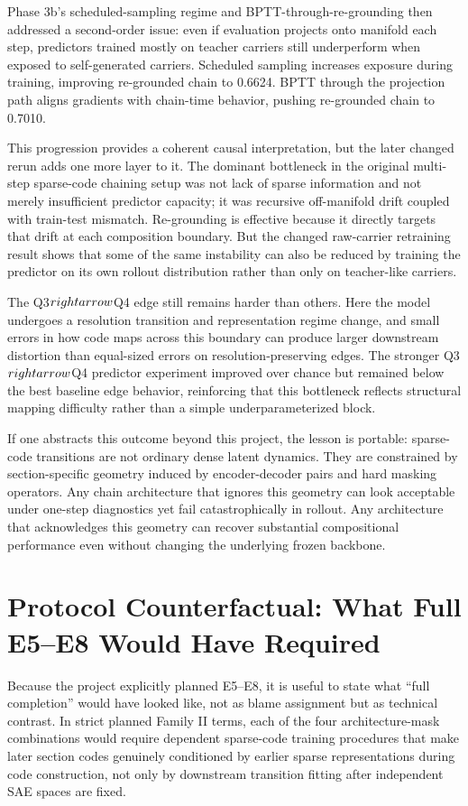 \documentclass[11pt]{article}
\begin{document}
Phase 3b's scheduled-sampling regime and BPTT-through-re-grounding then addressed a second-order issue: even if evaluation projects onto manifold each step, predictors trained mostly on teacher carriers still underperform when exposed to self-generated carriers. Scheduled sampling increases exposure during training, improving re-grounded chain to 0.6624. BPTT through the projection path aligns gradients with chain-time behavior, pushing re-grounded chain to 0.7010.

This progression provides a coherent causal interpretation, but the later changed rerun adds one more layer to it. The dominant bottleneck in the original multi-step sparse-code chaining setup was not lack of sparse information and not merely insufficient predictor capacity; it was recursive off-manifold drift coupled with train-test mismatch. Re-grounding is effective because it directly targets that drift at each composition boundary. But the changed raw-carrier retraining result shows that some of the same instability can also be reduced by training the predictor on its own rollout distribution rather than only on teacher-like carriers.

The Q3$\\rightarrow$Q4 edge still remains harder than others. Here the model undergoes a resolution transition and representation regime change, and small errors in how code maps across this boundary can produce larger downstream distortion than equal-sized errors on resolution-preserving edges. The stronger Q3$\\rightarrow$Q4 predictor experiment improved over chance but remained below the best baseline edge behavior, reinforcing that this bottleneck reflects structural mapping difficulty rather than a simple underparameterized block.

If one abstracts this outcome beyond this project, the lesson is portable: sparse-code transitions are not ordinary dense latent dynamics. They are constrained by section-specific geometry induced by encoder-decoder pairs and hard masking operators. Any chain architecture that ignores this geometry can look acceptable under one-step diagnostics yet fail catastrophically in rollout. Any architecture that acknowledges this geometry can recover substantial compositional performance even without changing the underlying frozen backbone.

\section{Protocol Counterfactual: What Full E5--E8 Would Have Required}
Because the project explicitly planned E5--E8, it is useful to state what ``full completion'' would have looked like, not as blame assignment but as technical contrast. In strict planned Family II terms, each of the four architecture-mask combinations would require dependent sparse-code training procedures that make later section codes genuinely conditioned by earlier sparse representations during code construction, not only by downstream transition fitting after independent SAE spaces are fixed.
\end{document}
